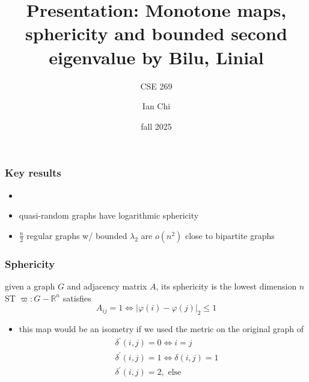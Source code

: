 \documentclass{beamer}
\title{Presentation: Monotone maps, sphericity and bounded second eigenvalue by Bilu, Linial}
\subtitle{CSE 269}
\author{Ian Chi}
\institute{ucsc}
\date{fall 2025}
\begin{document}
\frame{\titlepage}

\begin{frame}
\frametitle{Key results}\begin{itemize}
    \item {}
    \item quasi-random graphs have logarithmic sphericity
    \item \(\frac{n}{2}\) regular graphs w/ bounded \(\lambda_2\) are \(o(n^2)\) close to bipartite graphs
\end{itemize}
\end{frame}

\begin{frame}
    \frametitle{Sphericity}
    \begin{definition}[sphericity]
        given a graph \(G\) and adjacency matrix \(A\), its sphericity is the lowest dimension \(n\) ST \(\varpi:G-\mathbb R^n\) satisfies \begin{equation}
            A_{ij}=1\iff \lvert\varphi(i)-\varphi(j)\rvert_2\leq 1
        \end{equation}
    \end{definition}

    \begin{itemize}
        \item this map would be an isometry if we used the metric on the original graph of 
        \begin{equation}\begin{split}
            &\delta^\prime(i,j) = 0 \iff i=j\\
            &\delta^\prime(i,j) = 1 \iff \delta(i,j) = 1\\
            &\delta^\prime(i,j) = 2, \text{ else}
        \end{split}
        \end{equation}
    \end{itemize}

\end{frame}
\end{document}
